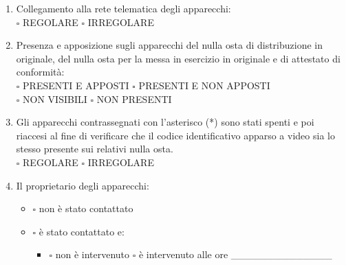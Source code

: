 \documentclass[12pt]{article}
\begin{document}
\begin{enumerate}[resume]
    \item Collegamento alla rete telematica degli apparecchi:
    \\\begin{math}\square\end{math} REGOLARE \begin{math}\square\end{math} IRREGOLARE
    \item Presenza e apposizione sugli apparecchi del nulla osta di distribuzione in originale, del nulla osta per la messa in esercizio in originale e di attestato di conformità:
    \\\begin{math} \square\end{math} PRESENTI E APPOSTI \begin{math}\square\end{math} PRESENTI E NON APPOSTI
    \\\begin{math}\square\end{math} NON VISIBILI \begin{math}\square\end{math} NON PRESENTI
    \item Gli apparecchi contrassegnati con l’asterisco (*) sono stati spenti e poi riaccesi al fine di verificare che il codice identificativo apparso a video sia lo stesso presente sui relativi nulla osta.
    \\\begin{math} \square\end{math} REGOLARE \begin{math}\square\end{math} IRREGOLARE
    \item Il proprietario degli apparecchi:
    \begin{itemize}[label={}]
        \item \begin{math}\square\end{math} non è stato contattato
        \item \begin{math}\square\end{math} è stato contattato e:
        \begin{itemize}[]
            \item \begin{math}\square\end{math} non è intervenuto \begin{math}\square\end{math} è intervenuto alle ore \_\_\_\_\_\_\_\_\_\_\_\_\_\_

\end{itemize}
\end{itemize}
\end{enumerate}
\end{document}
